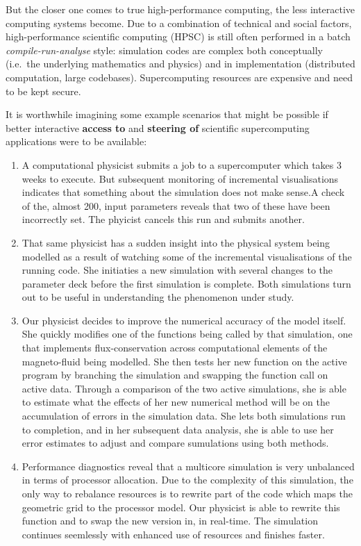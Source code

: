 \documentclass[a4paper,fontsize=12pt]{scrartcl}
\begin{document}
But the closer one comes to true high-performance computing, the less
interactive computing systems become. Due to a combination of
technical and social factors, high-performance scientific computing
(HPSC) is still often performed in a batch \emph{compile-run-analyse}
style: simulation codes are complex both conceptually (i.e.~the
underlying mathematics and physics) and in implementation (distributed
computation, large codebases). Supercomputing resources are expensive
and need to be kept secure.

It is worthwhile imagining some example scenarios that might be
possible if better interactive \textbf{access to} and \textbf{steering
  of} scientific supercomputing applications were to be available:
\begin{enumerate}
\item A computational physicist submits a job to a supercomputer which
  takes 3 weeks to execute. But subsequent monitoring of incremental
  visualisations indicates that something about the simulation does
  not make sense.A check of the, almost 200, input parameters reveals
  that two of these have been incorrectly set. The phyicist cancels
  this run and submits another.

\item That same physicist has a sudden insight into the physical
  system being modelled as a result of watching some of the
  incremental visualisations of the running code. She initiaties a new
  simulation with several changes to the parameter deck before the
  first simulation is complete. Both simulations turn out to be useful
  in understanding the phenomenon under study.

\item Our physicist decides to improve the numerical accuracy of the
  model itself. She quickly modifies one of the functions being called
  by that simulation, one that implements flux-conservation across
  computational elements of the magneto-fluid being modelled. She then
  tests her new function on the active program by branching the
  simulation and swapping the function call on active data. Through a
  comparison of the two active simulations, she is able to estimate
  what the effects of her new numerical method will be on the
  accumulation of errors in the simulation data. She lets both
  simulations run to completion, and in her subsequent data analysis,
  she is able to use her error estimates to adjust and compare
  sumulations using both methods.

\item Performance diagnostics reveal that a multicore simulation is
  very unbalanced in terms of processor allocation. Due to the
  complexity of this simulation, the only way to rebalance resources
  is to rewrite part of the code which maps the geometric grid to the
  processor model. Our physicist is able to rewrite this function and
  to swap the new version in, in real-time. The simulation continues
  seemlessly with enhanced use of resources and finishes faster.


\end{enumerate}
\end{document}
